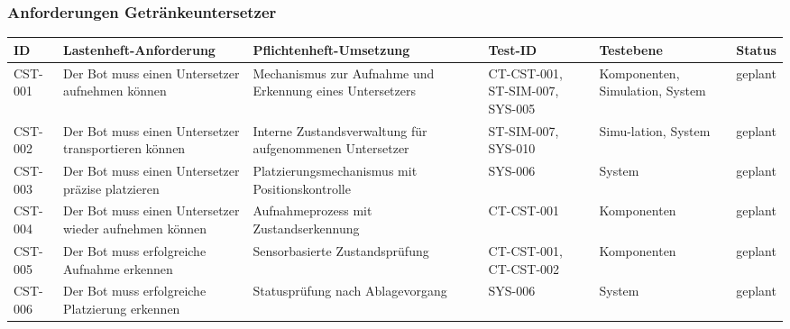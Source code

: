 \documentclass[
  a4paper,
  12pt,
  DIV=12,        %
  parskip=half,  %
  headings=small %
]{scrartcl}
\theoremstyle{definition}
\theoremstyle{definition}
\begin{document}
\begin{landscape}
\subsubsection{Anforderungen
Getränkeuntersetzer}\label{anforderungen-getruxe4nkeuntersetzer}

\begin{longtable}[]{@{}
  >{\raggedright\arraybackslash}p{}
  >{\raggedright\arraybackslash}p{}
  >{\raggedright\arraybackslash}p{}
  >{\raggedright\arraybackslash}p{}
  >{\raggedright\arraybackslash}p{}
  >{\raggedright\arraybackslash}p{}@{}}
\toprule\noalign{}
\begin{minipage}[b]{\linewidth}\raggedright
ID
\end{minipage} & \begin{minipage}[b]{\linewidth}\raggedright
Lastenheft-Anforderung
\end{minipage} & \begin{minipage}[b]{\linewidth}\raggedright
Pflichtenheft-Umsetzung
\end{minipage} & \begin{minipage}[b]{\linewidth}\raggedright
Test-ID
\end{minipage} & \begin{minipage}[b]{\linewidth}\raggedright
Testebene
\end{minipage} & \begin{minipage}[b]{\linewidth}\raggedright
Status
\end{minipage} \\
\midrule\noalign{}
\endhead
\bottomrule\noalign{}
\endlastfoot
CST-001 & Der Bot muss einen Untersetzer aufnehmen können & Mechanismus
zur Aufnahme und Erkennung eines Untersetzers & CT-CST-001, ST-SIM-007,
SYS-005 & Komponenten, Simulation, System & geplant \\
CST-002 & Der Bot muss einen Untersetzer transportieren können & Interne
Zustandsverwaltung für aufgenommenen Untersetzer & ST-SIM-007, SYS-010 &
Simu-lation, System & geplant \\
CST-003 & Der Bot muss einen Untersetzer präzise platzieren &
Platzierungsmechanismus mit Positionskontrolle & SYS-006 & System &
geplant \\
CST-004 & Der Bot muss einen Untersetzer wieder aufnehmen können &
Aufnahmeprozess mit Zustandserkennung & CT-CST-001 & Komponenten &
geplant \\
CST-005 & Der Bot muss erfolgreiche Aufnahme erkennen & Sensorbasierte
Zustandsprüfung & CT-CST-001, CT-CST-002 & Komponenten & geplant \\
CST-006 & Der Bot muss erfolgreiche Platzierung erkennen & Statusprüfung
nach Ablagevorgang & SYS-006 & System & geplant \\
\end{longtable}
\end{landscape}
\end{document}
